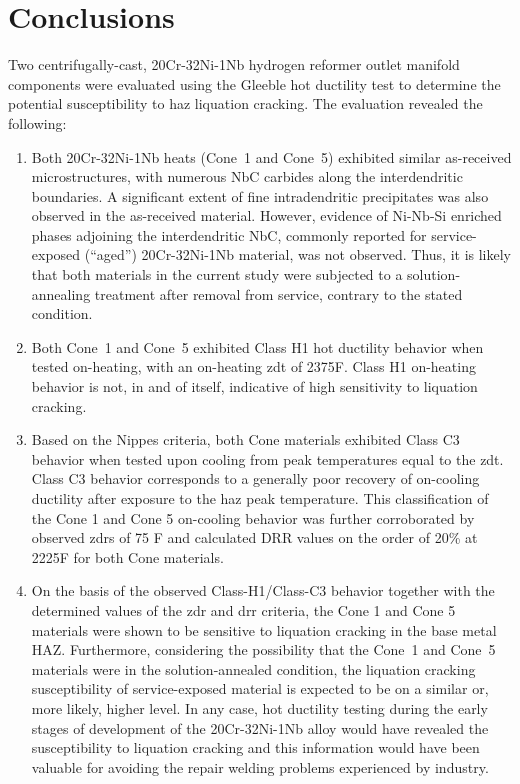 \chapter{Conclusions} \label{ch:conclusions}
Two centrifugally-cast, 20Cr-32Ni-1Nb hydrogen reformer outlet manifold components were evaluated using the Gleeble\texttrademark{} hot ductility test to determine the potential susceptibility to \gls{haz} liquation cracking.  The evaluation revealed the following:

\begin{enumerate}
\item Both 20Cr-32Ni-1Nb heats (Cone~1 and Cone~5) exhibited similar as-received microstructures, with numerous NbC carbides along the interdendritic boundaries. A significant extent of fine intradendritic precipitates was also observed in the as-received material. However, evidence of Ni-Nb-Si enriched phases adjoining the interdendritic NbC, commonly reported for service-exposed (“aged”) 20Cr-32Ni-1Nb material, was not observed. Thus, it is likely that both materials in the current study were subjected to a solution-annealing treatment after removal from service, contrary to the stated condition.
\item Both Cone~1 and Cone~5 exhibited Class H1 hot ductility behavior when tested on-heating, with an on-heating \gls{zdt} of 2375\textdegree{}F. Class H1 on-heating behavior is not, in and of itself, indicative of high sensitivity to liquation cracking.
\item Based on the Nippes criteria, both Cone materials exhibited Class C3 behavior when tested upon cooling from peak temperatures equal to the \gls{zdt}.  Class C3 behavior corresponds to a generally poor recovery of on-cooling ductility after exposure to the \gls{haz} peak temperature.  This classification of the Cone 1 and Cone 5 on-cooling behavior was further corroborated by observed \gls{zdr}s of 75 F\textdegree{} and calculated DRR values on the order of 20\% at 2225\textdegree{}F for both Cone materials.
\item On the basis of the observed Class-H1/Class-C3 behavior together with the determined values of the \gls{zdr} and \gls{drr} criteria, the Cone 1 and Cone 5 materials were shown to be sensitive to liquation cracking in the base metal HAZ. Furthermore, considering the possibility that the Cone~1 and Cone~5 materials were in the solution-annealed condition, the liquation cracking susceptibility of service-exposed material is expected to be on a similar or, more likely, higher level. In any case, hot ductility testing during the early stages of development of the 20Cr-32Ni-1Nb alloy would have revealed the susceptibility to liquation cracking and this information would have been valuable for avoiding the repair welding problems experienced by industry.

\end{enumerate}
